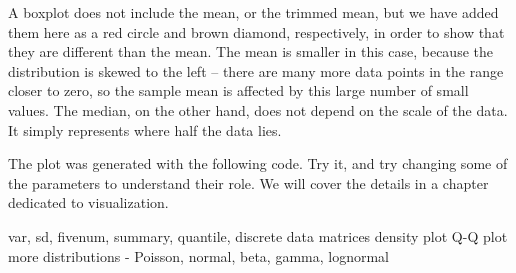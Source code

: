A boxplot does not include the mean, or the trimmed mean, but we have added them here as a red circle and brown diamond, respectively, in order to show that they are different than the mean. The mean is smaller in this case, because the distribution is skewed to the left -- there are many more data points in the range closer to zero, so the sample mean is affected by this large number of small values. The median, on the other hand, does not depend on the scale of the data. It simply represents where half the data lies. 

The plot was generated with the following code. Try it, and try changing some of the parameters to understand their role. We will cover the details in a chapter dedicated to visualization.



var, sd, fivenum, summary, quantile, 
discrete data
matrices
density plot
Q-Q plot
more distributions - Poisson, normal, beta, gamma, lognormal
